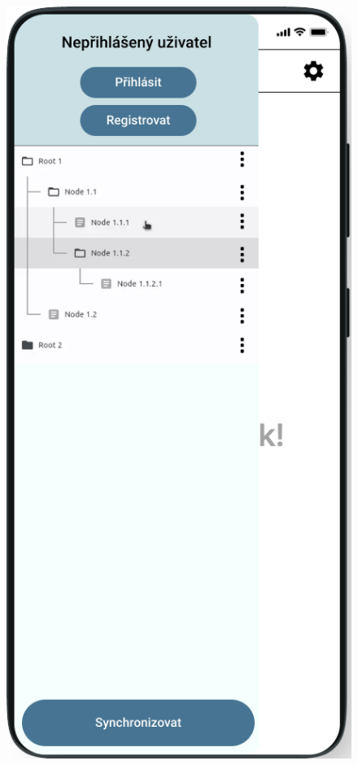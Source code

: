 \documentclass[czech, bc, kiv, he, iso690numb]{fasthesis}
\begin{document}
\begin{figure}[h!]
  \centering
  \begin{minipage}[h]{0.30\textwidth}
    \includegraphics[width=\textwidth]{img/BP-Runt/Planning/UI/Opened_drawer_upravene.png}

\end{minipage}
\end{figure}
\end{document}
